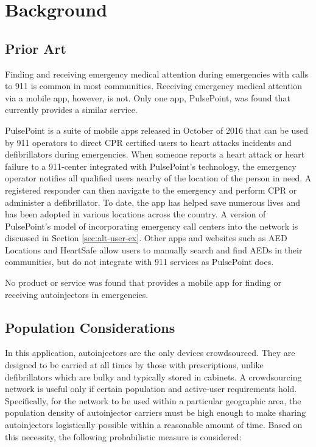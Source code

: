 \section{Background} \label{background}

\onehalfspacing

\subsection{Prior Art} \label{sec:prior-art}

Finding and receiving emergency medical attention during emergencies with calls to 911 is common in most communities. Receiving emergency medical attention via a mobile app, however, is not. Only one app, PulsePoint, was found that currently provides a similar service.

PulsePoint \cite{pulsepoint} is a suite of mobile apps released in October of 2016 that can be used by 911 operators to direct CPR certified users to heart attacks incidents and defibrillators during emergencies. When someone reports a heart attack or heart failure to a 911-center integrated with PulsePoint's technology, the emergency operator notifies all qualified users nearby of the location of the person in need. A registered responder can then navigate to the emergency and perform CPR or administer a defibrillator. To date, the app has helped save numerous lives and has been adopted in various locations across the country. A version of PulsePoint's model of incorporating emergency call centers into the network is discussed in Section \ref{sec:alt-user-ex}. Other apps and websites such as AED Locations \cite{aedlocations} and HeartSafe \cite{heartsafe} allow users to manually search and find AEDs in their communities, but do not integrate with 911 services as PulsePoint does.

No product or service was found that provides a mobile app for finding or receiving autoinjectors in emergencies. 

\subsection{Population Considerations} \label{sec:population}

In this application, autoinjectors are the only devices crowdsourced. They are designed to be carried at all times by those with prescriptions, unlike defibrillators which are bulky and typically stored in cabinets. A crowdsourcing network is useful only if certain population and active-user requirements hold. Specifically, for the network to be used within a particular geographic area, the population density of autoinjector carriers must be high enough to make sharing autoinjectors logistically possible within a reasonable amount of time. Based on this necessity, the following probabilistic measure is considered:

